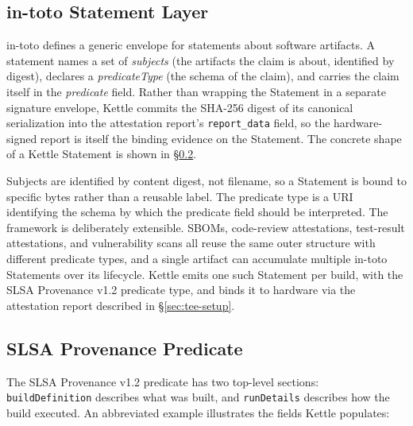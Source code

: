 \documentclass[11pt]{article}
\begin{document}
\subsection{in-toto Statement Layer}
\label{sec:in-toto}

in-toto defines a generic envelope for statements about software artifacts. A statement names a set of \emph{subjects} (the artifacts the claim is about, identified by digest), declares a \emph{predicateType} (the schema of the claim), and carries the claim itself in the \emph{predicate} field. Rather than wrapping the Statement in a separate signature envelope, Kettle commits the SHA-256 digest of its canonical serialization into the attestation report's \texttt{report\_data} field, so the hardware-signed report is itself the binding evidence on the Statement. The concrete shape of a Kettle Statement is shown in \S\ref{sec:slsa-predicate}.

Subjects are identified by content digest, not filename, so a Statement is bound to specific bytes rather than a reusable label. The predicate type is a URI identifying the schema by which the predicate field should be interpreted. The framework is deliberately extensible. SBOMs, code-review attestations, test-result attestations, and vulnerability scans all reuse the same outer structure with different predicate types, and a single artifact can accumulate multiple in-toto Statements over its lifecycle. Kettle emits one such Statement per build, with the SLSA Provenance v1.2 predicate type, and binds it to hardware via the attestation report described in \S\ref{sec:tee-setup}.

\subsection{SLSA Provenance Predicate}
\label{sec:slsa-predicate}

The SLSA Provenance v1.2 predicate has two top-level sections: \texttt{buildDefinition} describes what was built, and \texttt{runDetails} describes how the build executed. An abbreviated example illustrates the fields Kettle populates:
\end{document}
